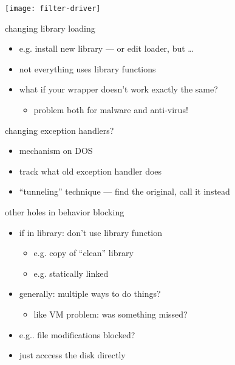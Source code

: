 
\begin{frame}
\texttt{[image: filter-driver]}
\end{frame}


\begin{frame}{changing library loading}
\begin{itemize}
    \item e.g. install new library --- or edit loader, but \ldots
    \vspace{.5cm}
    \item not everything uses library functions
    \item what if your wrapper doesn't work exactly the same?
        \begin{itemize}
        \item problem both for malware and anti-virus!
        \end{itemize}
\end{itemize}
\end{frame}


\begin{frame}{changing exception handlers?}
    \begin{itemize}
    \item mechanism on DOS
    \item track what old exception handler does
    \item ``tunneling'' technique --- find the original, call it instead
    \end{itemize}
\end{frame}

\begin{frame}{other holes in behavior blocking}
    \begin{itemize}
    \item if in library: don't use library function
        \begin{itemize}
        \item e.g. copy of ``clean'' library
        \item e.g. statically linked
        \end{itemize}
    \item generally: multiple ways to do things?
        \begin{itemize}
        \item like VM problem: was something missed?
        \end{itemize}
    \vspace{.5cm}
    \item e.g.. file modifications blocked?
    \item just acccess the disk directly
    \end{itemize}
\end{frame}

